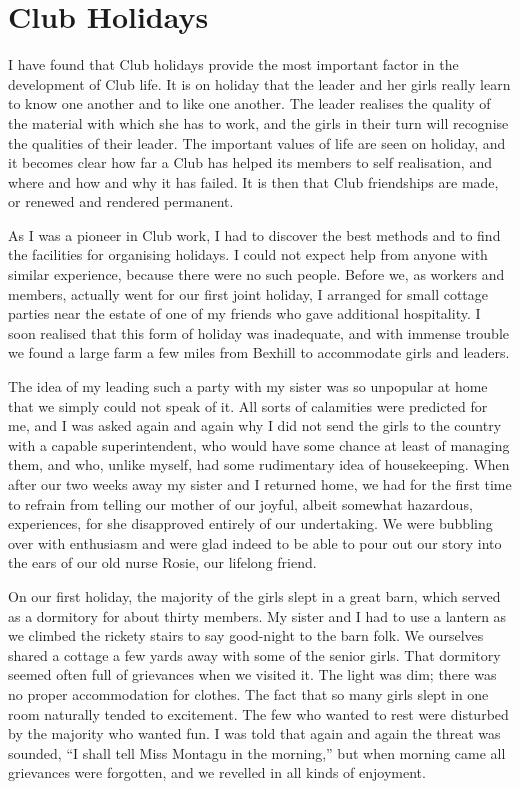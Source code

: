 \chapter{Club Holidays}

I have found that Club holidays provide the most important
factor in the development of Club life. It is on holiday
that the leader and her girls really learn to know one
another and to like one another. The leader realises the
quality of the material with which she has to work, and
the girls in their turn will recognise the qualities of their
leader. The important values of life are seen on holiday,
and it becomes clear how far a Club has helped its members
to self realisation, and where and how and why it
has failed. It is then that Club friendships are made, or
renewed and rendered permanent.

As I was a pioneer in Club work, I had to discover the
best methods and to find the facilities for organising holidays.
I could not expect help from anyone with similar
experience, because there were no such people. Before we,
as workers and members, actually went for our first joint
holiday, I arranged for small cottage parties near the
estate of one of my friends who gave additional
hospitality. I soon realised that this form of holiday was
inadequate, and with immense trouble we found a large
farm a few miles from Bexhill to accommodate girls and
leaders.

The idea of my leading such a party with my sister was
so unpopular at home that we simply could not speak of
it. All sorts of calamities were predicted for me, and I
was asked again and again why I did not send the girls to
the country with a capable superintendent, who would
have some chance at least of managing them, and who,
unlike myself, had some rudimentary idea of housekeeping.
When after our two weeks away my sister and I
returned home, we had for the first time to refrain from
telling our mother of our joyful, albeit somewhat
hazardous, experiences, for she disapproved entirely of
our undertaking. We were bubbling over with enthusiasm
and were glad indeed to be able to pour out our story into
the ears of our old nurse Rosie, our lifelong friend.

On our first holiday, the majority of the girls slept in
a great barn, which served as a dormitory for about
thirty members. My sister and I had to use a lantern
as we climbed the rickety stairs to say good-night to the
barn folk. We ourselves shared a cottage a few yards
away with some of the senior girls. That dormitory
seemed often full of grievances when we visited it. The
light was dim; there was no proper accommodation for
clothes. The fact that so many girls slept in one room
naturally tended to excitement. The few who wanted
to rest were disturbed by the majority who wanted fun.
I was told that again and again the threat was sounded,
“I shall tell Miss Montagu in the morning,” but when
morning came all grievances were forgotten, and we
revelled in all kinds of enjoyment.

